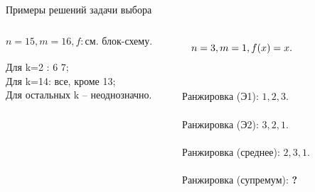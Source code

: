 \begin{frame}{Примеры решений задачи выбора}
 \begin{center}
	\begin{columns}
	 \vspace{-1ex}
	 \begin{equation*}
	    n = 15, m = 16,  f: \text{см. блок-схему}.
	 \end{equation*}
	  \vspace{-4ex}
	  {
	      \\[0.5ex] \hspace{2ex} Для k=2  :  6 7; 
	      \\[0.5ex] \hspace{2ex} Для k=14:  все, кроме 13; 
	      \\[0.5ex] \hspace{2ex} Для остальных k -- неоднозначно.
	  }
	  \vspace{1ex}
	  \begin{center}
	  \end{center} 
	  \begin{equation*}
	    \hspace{-2ex} n = 3, m = 1, f(x) = x.
	  \end{equation*}
	  \\ \vspace{1ex}
	      \\ \hspace{2ex} Ранжировка (Э1): $1, 2, 3$.
		  \\ \vspace{1ex}
	      \\ \hspace{2ex} Ранжировка (Э2): $3, 2, 1$.	      
		  \\ \vspace{1ex}
	      \\ \hspace{2ex}  Ранжировка (среднее): $2, 3, 1$.
		  \\ \vspace{1ex}
	      \\ \hspace{2ex} Ранжировка (супремум): \textbf{?}	     
	
	\end{columns}
 \end{center}
\end{frame} %

